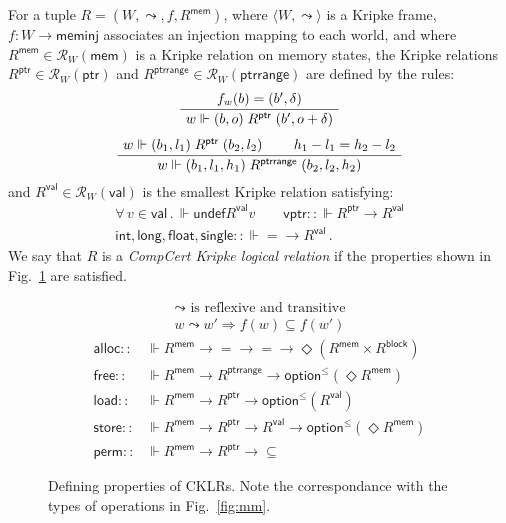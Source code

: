 \documentclass[acmsmall,authordraft]{acmart}
\newcommand{\kw}[1]{\ensuremath{ \mathsf{#1} }}
\begin{document}
\begin{definition} \label{def:cklr} %
For a tuple $R = (W, \leadsto, f, R^\kw{mem})$,
where
$\langle W, \leadsto \rangle$ is a Kripke frame,
$f : W \rightarrow \kw{meminj}$
associates an injection mapping to each world, and where
$R^\kw{mem} \in \mathcal{R}_{W}(\kw{mem})$
is a Kripke relation on memory states,
the Kripke relations
$R^\kw{ptr} \in \mathcal{R}_W(\kw{ptr})$ and
$R^\kw{ptrrange} \in \mathcal{R}_W(\kw{ptrrange})$
are defined by the rules:
\begin{gather*}
  \AxiomC{$f_w(b) = (b', \delta)$}
  \UnaryInfC{$w \Vdash (b, o) \mathrel{R^\kw{ptr}} (b', o + \delta)$}
  \DisplayProof
  \\[1ex]
  \AxiomC{$w \Vdash (b_1, l_1) \mathrel{R^\kw{ptr}} (b_2, l_2)$}
  \AxiomC{$h_1 - l_1 = h_2 - l_2$}
  \BinaryInfC{$w \Vdash (b_1, l_1, h_1) \mathrel{R^\kw{ptrrange}} (b_2, l_2, h_2)$}
  \DisplayProof
\end{gather*}
and
$R^\kw{val} \in \mathcal{R}_W(\kw{val})$
is the smallest Kripke relation satisfying:
\begin{gather*}
  \forall \, v \in \kw{val} \,.\,
    \Vdash \kw{undef} \mathrel{R^\kw{val}} v \qquad
  \kw{vptr} :: {\Vdash R^\kw{ptr} \rightarrow R^\kw{val}} \\
  \kw{int}, \kw{long}, \kw{float}, \kw{single} ::
    {\Vdash {=} \rightarrow R^\kw{val}} \,.
\end{gather*}
We say that $R$ is a \emph{CompCert Kripke logical relation}
if the properties shown in Fig.~\ref{fig:cklr-def} are satisfied.
\end{definition}

\begin{figure} %
  \begin{gather*}
    {\leadsto} \mbox{ is reflexive and transitive} \\
    w \leadsto w' \Rightarrow f(w) \subseteq f(w')
  \end{gather*}
  \begin{align*}
      \kw{alloc} ::
        &\Vdash R^\kw{mem} \rightarrow {=} \rightarrow {=} \rightarrow
        \Diamond (R^\kw{mem} \times R^\kw{block})
      \\
      \kw{free} ::
        &\Vdash R^\kw{mem} \rightarrow R^\kw{ptrrange} \rightarrow
        \kw{option}^\le(\Diamond R^\kw{mem})
      \\
      \kw{load} ::
        &\Vdash R^\kw{mem} \rightarrow R^\kw{ptr} \rightarrow
        \kw{option}^\le(R^\kw{val})
      \\
      \kw{store} ::
        &\Vdash R^\kw{mem} \rightarrow R^\kw{ptr} \rightarrow R^\kw{val} \rightarrow
        \kw{option}^\le(\Diamond R^\kw{mem})
      \\
      \kw{perm} ::
        &\Vdash R^\kw{mem} \rightarrow R^\kw{ptr} \rightarrow {\subseteq}
  \end{align*}
  \caption{Defining properties of CKLRs.
    Note the correspondance with
    the types of operations in Fig.~\ref{fig:mm}.}
  \label{fig:cklr-def}
\end{figure}
\end{document}
